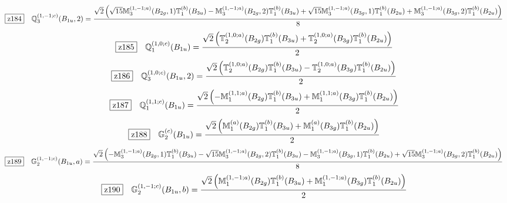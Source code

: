 \documentclass[fleqn,10pt,landscape]{jsarticle}
\begin{document}
\begin{dmath*}
\hspace*{3mm}\fbox{z184}\quad \mathbb{Q}_{3}^{(1,-1;c)}(B_{1u},2)=\frac{\sqrt{2} \left(\sqrt{15} \mathbb{M}_{3}^{(1,-1;a)}(B_{2g},1) \mathbb{T}_{1}^{(b)}(B_{3u}) - \mathbb{M}_{3}^{(1,-1;a)}(B_{2g},2) \mathbb{T}_{1}^{(b)}(B_{3u}) + \sqrt{15} \mathbb{M}_{3}^{(1,-1;a)}(B_{3g},1) \mathbb{T}_{1}^{(b)}(B_{2u}) + \mathbb{M}_{3}^{(1,-1;a)}(B_{3g},2) \mathbb{T}_{1}^{(b)}(B_{2u})\right)}{8}
\end{dmath*}
\begin{dmath*}
\hspace*{3mm}\fbox{z185}\quad \mathbb{Q}_{1}^{(1,0;c)}(B_{1u})=\frac{\sqrt{2} \left(\mathbb{T}_{2}^{(1,0;a)}(B_{2g}) \mathbb{T}_{1}^{(b)}(B_{3u}) + \mathbb{T}_{2}^{(1,0;a)}(B_{3g}) \mathbb{T}_{1}^{(b)}(B_{2u})\right)}{2}
\end{dmath*}
\begin{dmath*}
\hspace*{3mm}\fbox{z186}\quad \mathbb{Q}_{3}^{(1,0;c)}(B_{1u},2)=\frac{\sqrt{2} \left(\mathbb{T}_{2}^{(1,0;a)}(B_{2g}) \mathbb{T}_{1}^{(b)}(B_{3u}) - \mathbb{T}_{2}^{(1,0;a)}(B_{3g}) \mathbb{T}_{1}^{(b)}(B_{2u})\right)}{2}
\end{dmath*}
\begin{dmath*}
\hspace*{3mm}\fbox{z187}\quad \mathbb{Q}_{1}^{(1,1;c)}(B_{1u})=\frac{\sqrt{2} \left(- \mathbb{M}_{1}^{(1,1;a)}(B_{2g}) \mathbb{T}_{1}^{(b)}(B_{3u}) + \mathbb{M}_{1}^{(1,1;a)}(B_{3g}) \mathbb{T}_{1}^{(b)}(B_{2u})\right)}{2}
\end{dmath*}
\begin{dmath*}
\hspace*{3mm}\fbox{z188}\quad \mathbb{G}_{2}^{(c)}(B_{1u})=\frac{\sqrt{2} \left(\mathbb{M}_{1}^{(a)}(B_{2g}) \mathbb{T}_{1}^{(b)}(B_{3u}) + \mathbb{M}_{1}^{(a)}(B_{3g}) \mathbb{T}_{1}^{(b)}(B_{2u})\right)}{2}
\end{dmath*}
\begin{dmath*}
\hspace*{3mm}\fbox{z189}\quad \mathbb{G}_{2}^{(1,-1;c)}(B_{1u},a)=\frac{\sqrt{2} \left(- \mathbb{M}_{3}^{(1,-1;a)}(B_{2g},1) \mathbb{T}_{1}^{(b)}(B_{3u}) - \sqrt{15} \mathbb{M}_{3}^{(1,-1;a)}(B_{2g},2) \mathbb{T}_{1}^{(b)}(B_{3u}) - \mathbb{M}_{3}^{(1,-1;a)}(B_{3g},1) \mathbb{T}_{1}^{(b)}(B_{2u}) + \sqrt{15} \mathbb{M}_{3}^{(1,-1;a)}(B_{3g},2) \mathbb{T}_{1}^{(b)}(B_{2u})\right)}{8}
\end{dmath*}
\begin{dmath*}
\hspace*{3mm}\fbox{z190}\quad \mathbb{G}_{2}^{(1,-1;c)}(B_{1u},b)=\frac{\sqrt{2} \left(\mathbb{M}_{1}^{(1,-1;a)}(B_{2g}) \mathbb{T}_{1}^{(b)}(B_{3u}) + \mathbb{M}_{1}^{(1,-1;a)}(B_{3g}) \mathbb{T}_{1}^{(b)}(B_{2u})\right)}{2}
\end{dmath*}
\end{document}
